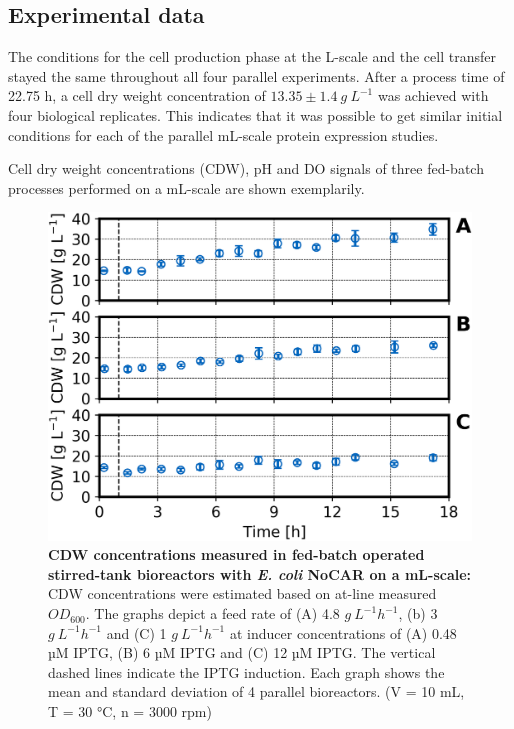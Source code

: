 \documentclass[sn-standardnature]{sn-jnl}%
\theoremstyle{thmstyleone}%
\theoremstyle{thmstyletwo}%
\theoremstyle{thmstylethree}%
\begin{document}
\subsection{Experimental data}
The conditions for the cell production phase at the L-scale and the cell transfer stayed the same throughout all four parallel experiments.
After a process time of 22.75 h, a cell dry weight concentration of $13.35 \pm 1.4\ g\ L^{-1}$ was achieved with four biological replicates.
This indicates that it was possible to get similar initial conditions for each of the parallel mL-scale protein expression studies.

Cell dry weight concentrations (CDW), pH and DO signals of three fed-batch processes performed on a mL-scale are shown exemplarily.

\begin{figure}[H]
    \centering
    \includegraphics[width=1.0\textwidth]{figures/btm_overview.png}
    \caption{
        \textbf{CDW concentrations measured in fed-batch operated stirred-tank bioreactors with \textit{E. coli} NoCAR on a mL-scale:}
        CDW concentrations were estimated based on at-line measured $OD_{600}$.
        The graphs depict a feed rate of (A) 4.8 $ g\ L^{-1} h^{-1}$, (b) 3 $ g\ L^{-1} h^{-1}$ and (C) 1 $ g\ L^{-1} h^{-1}$ at inducer concentrations of (A) 0.48 µM IPTG, (B) 6 µM IPTG and (C) 12 µM IPTG.
        The vertical dashed lines indicate the IPTG induction.
        Each graph shows the mean and standard deviation of 4 parallel bioreactors.
        (V = 10 mL, T = 30 °C, n = 3000 rpm)
    }
    \label{fig_btmoverview}
\end{figure}
\end{document}
